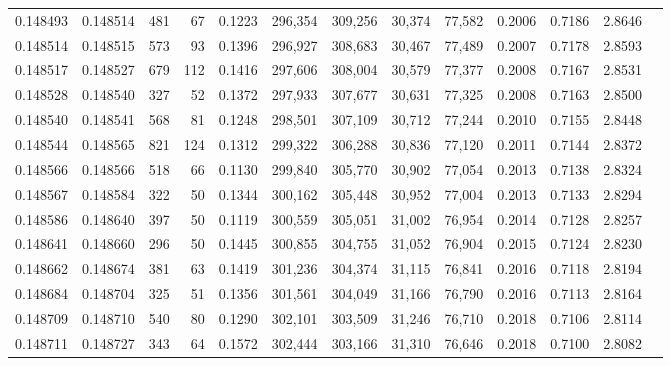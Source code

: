 \begin{tabular}{rrrrrrrrrrrrr}
0.148493 & 0.148514 &   481 &  67 &                                     0.1223 & 296,354 & 309,256 &  30,374 &  77,582 & 0.2006 & 0.7186 & 2.8646 \\
0.148514 & 0.148515 &   573 &  93 &                                     0.1396 & 296,927 & 308,683 &  30,467 &  77,489 & 0.2007 & 0.7178 & 2.8593 \\
0.148517 & 0.148527 &   679 & 112 &                                     0.1416 & 297,606 & 308,004 &  30,579 &  77,377 & 0.2008 & 0.7167 & 2.8531 \\
0.148528 & 0.148540 &   327 &  52 &                                     0.1372 & 297,933 & 307,677 &  30,631 &  77,325 & 0.2008 & 0.7163 & 2.8500 \\
0.148540 & 0.148541 &   568 &  81 &                                     0.1248 & 298,501 & 307,109 &  30,712 &  77,244 & 0.2010 & 0.7155 & 2.8448 \\
0.148544 & 0.148565 &   821 & 124 &                                     0.1312 & 299,322 & 306,288 &  30,836 &  77,120 & 0.2011 & 0.7144 & 2.8372 \\
0.148566 & 0.148566 &   518 &  66 &                                     0.1130 & 299,840 & 305,770 &  30,902 &  77,054 & 0.2013 & 0.7138 & 2.8324 \\
0.148567 & 0.148584 &   322 &  50 &                                     0.1344 & 300,162 & 305,448 &  30,952 &  77,004 & 0.2013 & 0.7133 & 2.8294 \\
0.148586 & 0.148640 &   397 &  50 &                                     0.1119 & 300,559 & 305,051 &  31,002 &  76,954 & 0.2014 & 0.7128 & 2.8257 \\
0.148641 & 0.148660 &   296 &  50 &                                     0.1445 & 300,855 & 304,755 &  31,052 &  76,904 & 0.2015 & 0.7124 & 2.8230 \\
0.148662 & 0.148674 &   381 &  63 &                                     0.1419 & 301,236 & 304,374 &  31,115 &  76,841 & 0.2016 & 0.7118 & 2.8194 \\
0.148684 & 0.148704 &   325 &  51 &                                     0.1356 & 301,561 & 304,049 &  31,166 &  76,790 & 0.2016 & 0.7113 & 2.8164 \\
0.148709 & 0.148710 &   540 &  80 &                                     0.1290 & 302,101 & 303,509 &  31,246 &  76,710 & 0.2018 & 0.7106 & 2.8114 \\
0.148711 & 0.148727 &   343 &  64 &                                     0.1572 & 302,444 & 303,166 &  31,310 &  76,646 & 0.2018 & 0.7100 & 2.8082 \\

\end{tabular}

